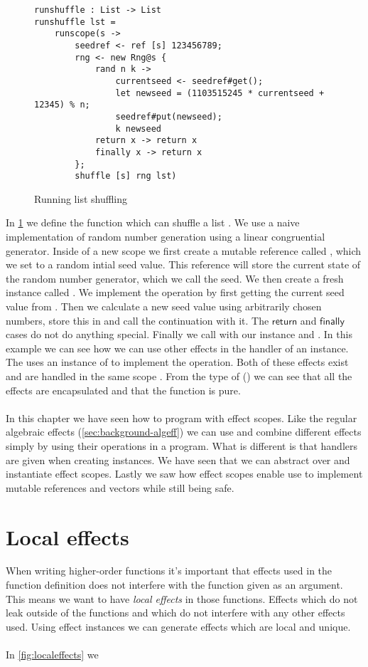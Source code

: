 \begin{figure}[H]
\caption{Running list shuffling}
\begin{verbatim}
runshuffle : List -> List
runshuffle lst =
	runscope(s ->
		seedref <- ref [s] 123456789;
		rng <- new Rng@s {
			rand n k ->
				currentseed <- seedref#get();
				let newseed = (1103515245 * currentseed + 12345) % n;
				seedref#put(newseed);
				k newseed
			return x -> return x
			finally x -> return x
		};
		shuffle [s] rng lst)
\end{verbatim}
\label{fig:rng}
\end{figure}

In \cref{fig:rng} we define the function  which can shuffle a list .
We use a naive implementation of random number generation using a linear congruential generator.
Inside of a new scope  we first create a mutable reference called , which we set to a random intial seed value.
This reference will store the current state of the random number generator, which we call the seed.
We then create a fresh  instance called .
We implement the  operation by first getting the current seed value from .
Then we calculate a new seed value using arbitrarily chosen numbers, store this in  and call the continuation with it.
The $\mathsf{return}$ and $\mathsf{finally}$ cases do not do anything special.
Finally we call  with our  instance and .
In this example we can see how we can use other effects in the handler of an instance.
The  uses an instance of  to implement the  operation.
Both of these effects exist and are handled in the same scope .
From the type of  () we can see that all the effects are encapsulated and that the function is pure.
\\\\
In this chapter we have seen how to program with effect scopes.
Like the regular algebraic effects (\cref{sec:background-algeff}) we can use and combine different effects simply by using their operations in a program.
What is different is that handlers are given when creating instances.
We have seen that we can abstract over and instantiate effect scopes.
Lastly we saw how effect scopes enable use to implement mutable references and vectors while still being safe.

\iffalse
\section{Local effects}
When writing higher-order functions it's important that effects used in the function definition does not interfere with the function given as an argument.
This means we want to have \emph{local effects} in those functions.
Effects which do not leak outside of the functions and which do not interfere with any other effects used.
Using effect instances we can generate effects which are local and unique.
\\\\
In \cref{fig:localeffects} we 

